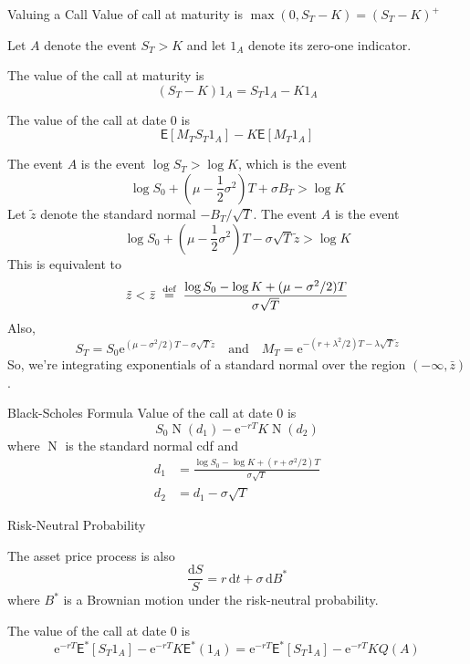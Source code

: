 \documentclass[10pt]{beamer}
\DeclareMathOperator{\N}{N}
\newcommand{\D}{\mathrm{d}}
\newcommand{\E}{\mathrm{e}}
\newcommand{\mye}{\ensuremath{\mathsf{E}}}
\newcommand{\eqdef}{\;\buildrel \text{d{}ef}\over = \;}
\newcommand{\tz}{\tilde{z}}
\begin{document}
\begin{frame}{Valuing a Call}
Value of call at maturity is $\max(0,S_T-K)=(S_T-K)^+$

Let $A$ denote the event $S_T>K$ and let $1_A$ denote its zero-one indicator.  

The value of the call at maturity is
$$(S_T-K)1_A = S_T1_A - K1_A$$

The value of the call at date 0 is
$$\mye[M_TS_T1_A] - K\mye[M_T1_A]$$
\end{frame}

\begin{frame}[plain]
The event $A$ is the event $\log S_T > \log K$, which is the event
$$\log S_0 + \left(\mu - \frac{1}{2}\sigma^2\right)T + \sigma B_T > \log K$$
Let $\tz$ denote the standard normal $-B_T/\sqrt{T}$.  The event $A$ is the event
$$\log S_0 + \left(\mu - \frac{1}{2}\sigma^2\right)T - \sigma \sqrt{T}\tz > \log K$$
This is equivalent to
$$\tz < \bar{z} \eqdef \frac{\log S_0 - \log K + (\mu-\sigma^2/2)T}{\sigma\sqrt{T}}$$
Also,
$$S_T = S_0 \E^{(\mu-\sigma^2/2)T - \sigma\sqrt{T}\tz} \quad \text{and} \quad
M_T =  \E^{-(r+\lambda^2/2)T - \lambda \sqrt{T}\tz}$$
So, we're integrating exponentials of a standard normal over the region $(-\infty, \bar{z})$.


    
\end{frame}


\begin{frame}{Black-Scholes Formula}
Value of the call at date 0 is
$$S_0\N(d_1) - \E^{-rT}K\N(d_2)$$
where $\N$ is the standard normal cdf and
\begin{align*}
    d_1 &= \frac{\log S_0 - \log K + (r+\sigma^2/2)T}{\sigma\sqrt{T}}\\
    d_2 &= d_1 - \sigma\sqrt{T}
\end{align*}
    
\end{frame}

\begin{frame}{Risk-Neutral Probability}

    The asset price process is also
    $$\frac{\D S}{S} = r\,\D t + \sigma\,\D B^*$$
    where $B^*$ is a Brownian motion under the risk-neutral probability.
    
    The value of the call at date 0 is
    $$\E^{-rT}\mye^*[S_T1_A] - \E^{-rT}K\mye^*(1_A) = \E^{-rT}\mye^*[S_T1_A] - \E^{-rT}KQ(A)$$
    
    \end{frame}
\end{document}
